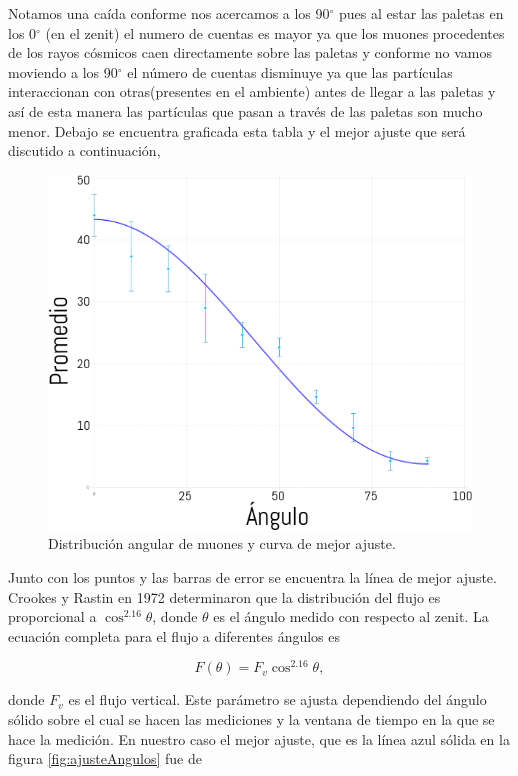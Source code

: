 \documentclass[a4paper,10pt]{article}
\numberwithin{equation}{section}
\begin{document}
Notamos una caída conforme nos acercamos a los 90$^\circ$  pues al estar las paletas en 
los 0$^\circ$ (en el zenit) el numero de cuentas es mayor ya que los muones procedentes 
de los rayos cósmicos caen directamente sobre las  paletas y conforme no vamos moviendo  
a los 90$^\circ$  el número de cuentas disminuye  ya que las partículas
interaccionan con otras(presentes en el ambiente) antes de  llegar a las paletas y 
así de esta manera las partículas que pasan a través de las paletas  son mucho menor. 
Debajo se encuentra graficada esta tabla y el mejor ajuste que será discutido a continuación,

\begin{figure}[H]
 \center 
 \includegraphics[scale=0.5]{ajusteAngulos}
 \caption{Distribución angular de muones y curva de mejor ajuste.}
 \label{fig:ajusteAngulos}
\end{figure}

Junto con los puntos y las barras de error se encuentra la línea de mejor ajuste. Crookes 
y Rastin en 1972 \cite{crookes} determinaron que la distribución del flujo es proporcional 
a $\cos^{2.16}{\theta}$, donde $\theta$ es el ángulo medido con respecto al zenit. La 
ecuación completa para el flujo a diferentes ángulos es 

\begin{equation}
 F(\theta) = F_v\cos^{2.16}{\theta},
\end{equation}

donde $F_v$ es el flujo vertical. Este parámetro se ajusta dependiendo del ángulo 
sólido sobre el cual se hacen las mediciones y la ventana de tiempo en la que se 
hace la medición. En nuestro caso el mejor ajuste, que es la línea azul sólida 
en la figura \eqref{fig:ajusteAngulos} fue de 
\end{document}
